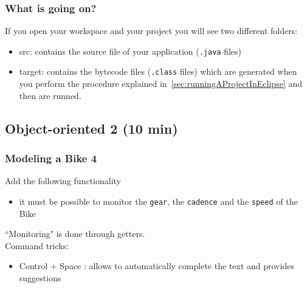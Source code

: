 \documentclass{article}
\theoremstyle{definition}
\begin{document}
\subsubsection{What is going on?}
If you open your workspace and your project you will see two different folders:
\begin{itemize}
\item src: contains the source file of your application (\texttt{.java} files)
\item target: contains the bytecode files (\texttt{.class} files) which are generated when you perform the procedure explained in~\ref{sec:runningAProjectInEclipse} and then are runned.
\end{itemize}

\subsection{Object-oriented 2 (10 min)}

\subsubsection{Modeling a Bike 4}
Add the following functionality
\begin{itemize}
\item it must be possible to monitor the \texttt{gear}, the \texttt{cadence} and the \texttt{speed} of the Bike
\end{itemize}

``Monitoring" is done through getters.\\
Command tricks:
\begin{itemize}
\item Control + Space : allows to automatically complete the text and provides suggestions
\end{itemize}
\end{document}
